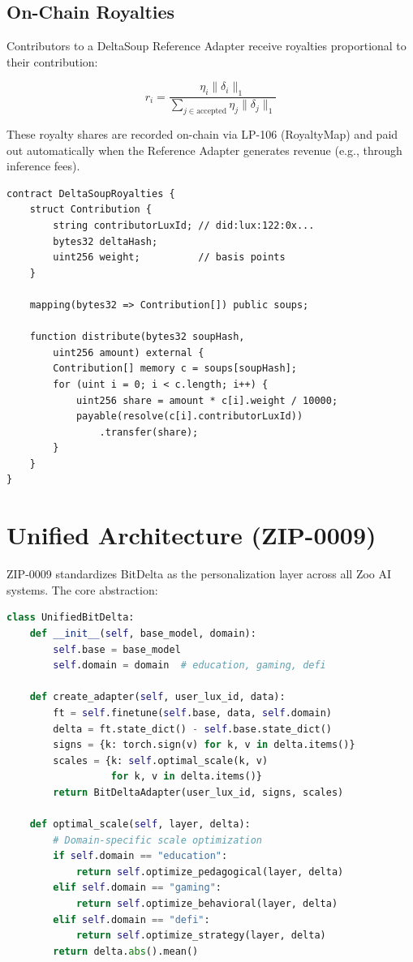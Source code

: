 \documentclass[11pt,letterpaper]{article}
\begin{document}
\subsection{On-Chain Royalties}

Contributors to a DeltaSoup Reference Adapter receive royalties proportional to their contribution:

\begin{equation}
r_i = \frac{\eta_i \|\delta_i\|_1}{\sum_{j \in \text{accepted}} \eta_j \|\delta_j\|_1}
\label{eq:royalty}
\end{equation}

These royalty shares are recorded on-chain via LP-106 (RoyaltyMap) and paid out automatically when the Reference Adapter generates revenue (e.g., through inference fees).

\begin{lstlisting}[language=Solidity,caption=DeltaSoup royalty contract]
contract DeltaSoupRoyalties {
    struct Contribution {
        string contributorLuxId; // did:lux:122:0x...
        bytes32 deltaHash;
        uint256 weight;          // basis points
    }

    mapping(bytes32 => Contribution[]) public soups;

    function distribute(bytes32 soupHash,
        uint256 amount) external {
        Contribution[] memory c = soups[soupHash];
        for (uint i = 0; i < c.length; i++) {
            uint256 share = amount * c[i].weight / 10000;
            payable(resolve(c[i].contributorLuxId))
                .transfer(share);
        }
    }
}
\end{lstlisting}

\section{Unified Architecture (ZIP-0009)}

ZIP-0009 standardizes BitDelta as the personalization layer across all Zoo AI systems. The core abstraction:

\begin{lstlisting}[language=Python,caption=Unified BitDelta interface]
class UnifiedBitDelta:
    def __init__(self, base_model, domain):
        self.base = base_model
        self.domain = domain  # education, gaming, defi

    def create_adapter(self, user_lux_id, data):
        ft = self.finetune(self.base, data, self.domain)
        delta = ft.state_dict() - self.base.state_dict()
        signs = {k: torch.sign(v) for k, v in delta.items()}
        scales = {k: self.optimal_scale(k, v)
                  for k, v in delta.items()}
        return BitDeltaAdapter(user_lux_id, signs, scales)

    def optimal_scale(self, layer, delta):
        # Domain-specific scale optimization
        if self.domain == "education":
            return self.optimize_pedagogical(layer, delta)
        elif self.domain == "gaming":
            return self.optimize_behavioral(layer, delta)
        elif self.domain == "defi":
            return self.optimize_strategy(layer, delta)
        return delta.abs().mean()
\end{lstlisting}
\end{document}
